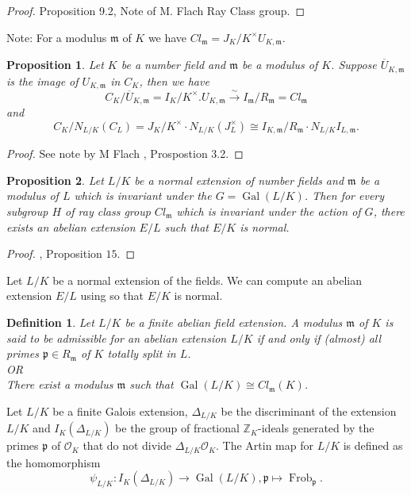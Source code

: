 \documentclass{article}
\newtheorem{proposition}{Proposition}[section]
\newtheorem{definition}{Definition}[section]
\theoremstyle{break}
\def\Gal{\mathop{\mathrm{Gal}}\nolimits}
\def\Gal{\mathop{\mathrm{Gal}}\nolimits}
\def\Frob{\mathop{\mathrm{Frob}}\nolimits}
\def\Gal{\mathop{\mathrm{Gal}}\nolimits}
\begin{document}
\begin{proof}
Proposition 9.2, Note of M. Flach Ray Class group.
\end{proof}
Note: For a modulus $\mathfrak{m}$ of $K$ we have $Cl_{\mathfrak{m}}=J_{K}/ K^{\times}U_{K,\mathfrak{m}}.$\\
\begin{proposition}
Let $K$ be a number field and $\mathfrak{m}$ be a modulus of $K$. Suppose $\overline{U}_{K,\mathfrak{m}}$ is the image of $U_{K,\mathfrak{m}}$ in $C_K$, then we have
\[  C_K/\overline{U}_{K,\mathfrak{m}}= I_{K}/K^{\times}.U_{K,\mathfrak{m}} \xrightarrow{\sim} I_{\mathfrak{m}}/R_{\mathfrak{m}}=Cl_{\mathfrak{m}}  \]
and 
\[C_K/ N_{L/K}(C_L)= J_{K}/K^{\times}\cdot N_{L/K}(J_{L}^{\times}) \cong I_{K,\mathfrak{m}}/R_{\mathfrak{m}}\cdot N_{L/K}I_{L,\mathfrak{m}}  . \]
\end{proposition}
\begin{proof}
See note by M Flach , Prospostion 3.2.
\end{proof}
\begin{proposition}
Let $L/K$ be a normal extension of number fields and $\mathfrak{m}$ be a modulus of $L$ which is invariant under the $G=\Gal(L/K)$. Then for every subgroup $H$ of ray class group $Cl_{\mathfrak{m}}$ which is invariant under the action of $G$, there exists an abelian extension $E/L$ such that $E/K$ is normal. 
\end{proposition}
\begin{proof}
\cite{Hofmann}, Proposition $15$.
\end{proof}
Let $L/K$ be a normal extension of the fields. We can compute an abelian extension $E/L$ using \cite{Hofmann} so that $E/K$ is normal.


\begin{definition}
Let $L/K$ be a finite abelian field extension. A modulus $\mathfrak{m}$ of $K$ is said to be admissible for an abelian extension $L/K$ if and only if (almost) all primes $ \mathfrak{p} \in R_{\mathfrak{m}}$ of $K$ totally split in $L$.      \\
OR\\
There exist a modulus $\mathfrak{m}$ such that $\Gal(L/K)\cong Cl_{\mathfrak{m}}(K)$.
        
\end{definition}
Let $L/K$ be a finite Galois extension, $\Delta_{L/K}$ be the discriminant of the extension $L/K$ and $I_{K}(\Delta_{L/K})$ be the group of fractional $\mathbb{Z}_{K}$-ideals generated by the primes $\mathfrak{p}$ of $\mathcal{O}_{K}$ that do not divide $\Delta_{L/K}\mathcal{O}_{K}$. The Artin map for $L/K$ is defined as the homomorphism 
\[ \psi_{L/K}: I_{K}(\Delta_{L/K}) \rightarrow \Gal(L/K), \mathfrak{p}\mapsto \Frob_{\mathfrak{p}}.\]
  
\end{document}
